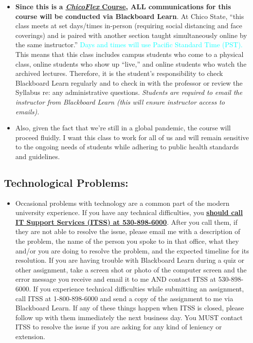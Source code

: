 \documentclass[11pt,]{article}
\providecommand{\tightlist}{%
  \setlength{\itemsep}{0pt}\setlength{\parskip}{0pt}}
\begin{document}
\begin{itemize}
\item
  \textbf{Since this is a
  \href{https://www.csuchico.edu/tlp/chicoflex/faq.shtml\#whatiscoflex}{\emph{ChicoFlex}
  Course}, ALL communications for this course will be conducted via
  Blackboard Learn}. At Chico State, ``this class meets at set
  days/times in-person (requiring social distancing and face coverings)
  and is paired with another section taught simultaneously online by the
  same instructor.''
  \textcolor{cyan}{Days and times will use Pacific Standard Time (PST).}
  This means that this class includes campus students who come to a
  physical class, online students who show up ``live,'' and online
  students who watch the archived lectures. Therefore, it is the
  student's responsibility to check Blackboard Learn regularly and to
  check in with the professor or review the Syllabus re: any
  administrative questions. \emph{Students are required to email the
  instructor from Blackboard Learn (this will ensure instructor access
  to emails).}
\item
  Also, given the fact that we're still in a global pandemic, the course
  will proceed fluidly. I want this class to work for all of us and will
  remain sensitive to the ongoing needs of students while adhering to
  public health standards and guidelines.
\end{itemize}

\hypertarget{technological-problems}{%
\subsection{Technological Problems:}\label{technological-problems}}

\begin{itemize}
\tightlist
\item
  Occasional problems with technology are a common part of the modern
  university experience. If you have any technical difficulties, you
  \href{https://www.csuchico.edu/itss/}{\textbf{should call IT Support
  Services (ITSS) at 530-898-6000}}. After you call them, if they are
  not able to resolve the issue, please email me with a description of
  the problem, the name of the person you spoke to in that office, what
  they and/or you are doing to resolve the problem, and the expected
  timeline for its resolution. If you are having trouble with Blackboard
  Learn during a quiz or other assignment, take a screen shot or photo
  of the computer screen and the error message you receive and email it
  to me AND contact ITSS at 530-898-6000. If you experience technical
  difficulties while submitting an assignment, call ITSS at
  1-800-898-6000 and send a copy of the assignment to me via Blackboard
  Learn. If any of these things happen when ITSS is closed, please
  follow up with them immediately the next business day. You MUST
  contact ITSS to resolve the issue if you are asking for any kind of
  leniency or extension.
\end{itemize}
\end{document}

